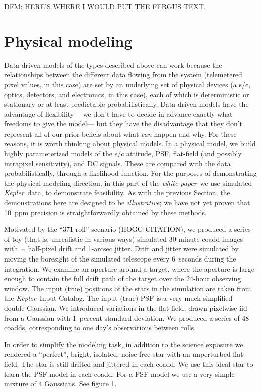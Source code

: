 \documentclass[letterpaper,12pt,preprint]{aastex}
\newcommand{\sectionname}{Section}
\newcommand{\documentname}{\textsl{white paper}}
\newcommand{\observatory}[1]{\textsl{#1}}
\newcommand{\Kepler}{\observatory{Kepler}}
\begin{document}
DFM: HERE'S WHERE I WOULD PUT THE FERGUS TEXT.

\section{Physical modeling}\label{sec:physical}

Data-driven models of the types described above can work
  because the relationships between the different data flowing from the system
  (telemetered pixel values, in this case)
  are set by an underlying set of physical devices
  (a s/c, optics, detectors, and electronics, in this case),
  each of which is deterministic or stationary or at least predictable probabilistically.
Data-driven models have the advantage of flexibility%
  ---we don't have to decide in advance exactly what freedoms to give the model---%
  but they have the disadvantage that they don't represent all of our prior beliefs
  about what \emph{can} happen and why.
For these reasons, it is worth thinking about physical models.
In a physical model, we build highly parameterized models
  of the s/c attitude, PSF, flat-field (and possibly intrapixel sensitivity),
  and DC signals.
These are compared with the data probabilistically,
  through a likelihood function.
For the purposes of demonstrating the physical modeling direction,
  in this part of the \documentname\ we use simulated \Kepler\ data,
  to demonstrate feasibility.
As with the previous \sectionname, the demonstrations here are designed
  to be \emph{illustrative};
  we have not yet proven that 10~ppm precision is straightforwardly obtained by these methods.

Motivated by the ``371-roll'' scenario (HOGG CITATION),
  we produced a series of toy (that is, unrealistic in various ways)
  simulated 30-minute coadd images with $\sim$ half-pixel drift and 1-arcsec jitter.
Drift and jitter were simulated by moving the boresight of the simulated telescope
  every 6~seconds during the integration.
We examine an aperture around a target,
  where the aperture is large enough to contain the full drift path
  of the target over the 24-hour observing window.
The input (true) positions of the stars in the simulation are
  taken from the \Kepler\ Input Catalog.
The input (true) PSF is a very much simplified double-Gaussian.
We introduced variations in the flat-field,
   drawn pixelwise iid from a Gaussian with 1~percent standard deviation.
We produced a series of 48 coadds,
   corresponding to one day's observations between rolls.

In order to simplify the modeling task, in addition to the science exposure we rendered a ``perfect'', bright, isolated, noise-free star with an unperturbed flat-field.  The star is still drifted and jittered in each coadd.  We use this ideal star to learn the PSF model in each coadd.  For a PSF model we use a very simple mixture of 4 Gaussians.  See figure 1.
\end{document}
